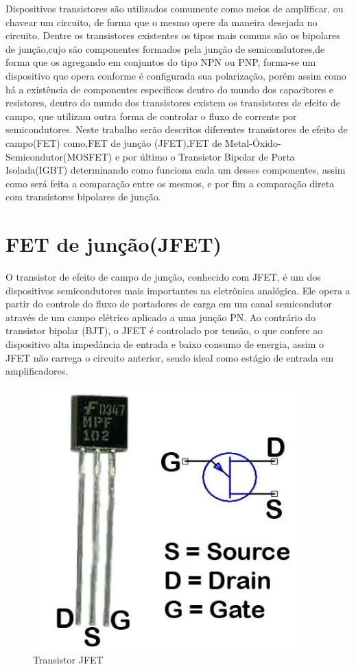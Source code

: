 \documentclass[12pt]{article}
\begin{document}
    Dispositivos transistores são utilizados comumente como meios de amplificar, ou chavear um circuito, de forma que o mesmo opere da maneira desejada no circuito. Dentre os transistores existentes os tipos mais comuns são os bipolares de junção,cujo são componentes formados pela junção de semicondutores,de forma que os agregando em conjuntos do tipo NPN ou PNP, forma-se um dispositivo que opera conforme é configurada sua polarização, porém assim como há a existência de componentes específicos dentro do mundo dos capacitores e resistores, dentro do mundo dos transistores existem os transistores de efeito de campo, que utilizam outra forma de controlar o fluxo de corrente por semicondutores. Neste trabalho serão descritos diferentes transistores de efeito de campo(FET) como,FET de junção (JFET),FET de Metal-Óxido-Semicondutor(MOSFET) e por último o Transistor Bipolar de Porta Isolada(IGBT) determinando como funciona cada um desses componentes, assim como será feita a comparação entre os mesmos, e por fim a comparação direta com transistores bipolares de junção. \cite{eletronica_analogica2015_jfet_2025}

\newpage


\section{FET de junção(JFET)}

O transistor de efeito de campo de junção, conhecido com JFET, é um dos dispositivos semicondutores mais importantes na eletrônica analógica. Ele opera a partir do controle do fluxo de portadores de carga em um canal semicondutor através de um campo elétrico aplicado a uma junção PN. Ao contrário do transistor bipolar (BJT), o JFET é controlado por tensão, o que confere ao dispositivo alta impedância de entrada e baixo consumo de energia, assim o JFET não carrega o circuito anterior, sendo ideal como estágio de entrada em amplificadores.

        \begin{figure}[htpb!]
            \centering
            \includegraphics[width=0.3\linewidth]{images/Captura de tela 2025-10-18 223003.png}
            \caption{Transistor JFET}
        \end{figure}
\end{document}
